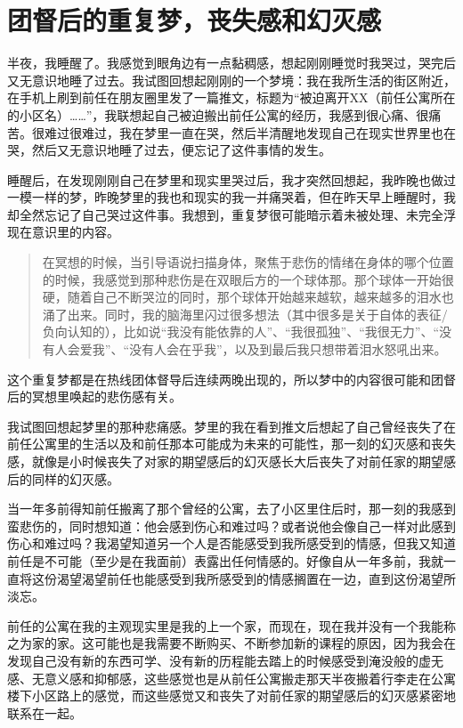 \chapter{团督后的重复梦，丧失感和幻灭感}




半夜，我睡醒了。我感觉到眼角边有一点黏稠感，想起刚刚睡觉时我哭过，哭完后又无意识地睡了过去。我试图回想起刚刚的一个梦境：我在我所生活的街区附近，在手机上刷到前任在朋友圈里发了一篇推文，标题为“被迫离开XX（前任公寓所在的小区名）……”，我联想起自己被迫搬出前任公寓的经历，我感到很心痛、很痛苦。很难过很难过，我在梦里一直在哭，然后半清醒地发现自己在现实世界里也在哭，然后又无意识地睡了过去，便忘记了这件事情的发生。

睡醒后，在发现刚刚自己在梦里和现实里哭过后，我才突然回想起，我昨晚也做过一模一样的梦，昨晚梦里的我也和现实的我一并痛哭着，但在昨天早上睡醒时，我却全然忘记了自己哭过这件事。我想到，重复梦很可能暗示着未被处理、未完全浮现在意识里的内容。

\blockquote{%
	在冥想的时候，当引导语说扫描身体，聚焦于悲伤的情绪在身体的哪个位置的时候，我感觉到那种悲伤是在双眼后方的一个球体那。那个球体一开始很硬，随着自己不断哭泣的同时，那个球体开始越来越软，越来越多的泪水也涌了出来。同时，我的脑海里闪过很多想法（其中很多是关于自体的表征/负向认知的），比如说“我没有能依靠的人”、“我很孤独”、“我很无力”、“没有人会爱我”、“没有人会在乎我”，以及到最后我只想带着泪水怒吼出来。

}

这个重复梦都是在热线团体督导后连续两晚出现的，所以梦中的内容很可能和团督后的冥想里唤起的悲伤感有关。

我试图回想起梦里的那种悲痛感。梦里的我在看到推文后想起了自己曾经丧失了在前任公寓里的生活以及和前任那本可能成为未来的可能性，那一刻的幻灭感和丧失感，就像是小时候丧失了对家的期望感后的幻灭感\pozhehao{}长大后丧失了对前任家的期望感后的同样的幻灭感。

当一年多前得知前任搬离了那个曾经的公寓，去了小区里住后时，那一刻的我感到蛮悲伤的，同时想知道：他会感到伤心和难过吗？或者说他会像自己一样对此感到伤心和难过吗？我渴望知道另一个人是否能感受到我所感受到的情感，但我又知道前任是不可能（至少是在我面前）表露出任何情感的。好像自从一年多前，我就一直将这份渴望\pozhehao{}渴望前任也能感受到我所感受到的情感\pozhehao{}搁置在一边，直到这份渴望所淡忘。

前任的公寓在我的主观现实里是我的上一个家，而现在，现在我并没有一个我能称之为家的家。这可能也是我需要不断购买、不断参加新的课程的原因，因为我会在发现自己没有新的东西可学、没有新的历程能去踏上的时候感受到淹没般的虚无感、无意义感和抑郁感，这些感觉也是从前任公寓搬走那天半夜搬着行李走在公寓楼下小区路上的感觉，而这些感觉又和丧失了对前任家的期望感后的幻灭感紧密地联系在一起。

